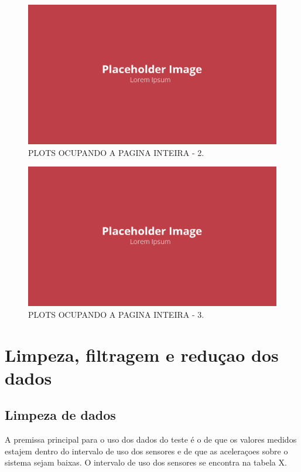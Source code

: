 \begin{figure}[!ht]
    \centering
    \includegraphics[width=.8\linewidth]{figuras/placeholder.png}
    \caption{PLOTS OCUPANDO A PAGINA INTEIRA - 2\cite{autor}.}
    \label{fig:placeholder}
\end{figure}

\begin{figure}[!ht]
    \centering
    \includegraphics[width=.8\linewidth]{figuras/placeholder.png}
    \caption{PLOTS OCUPANDO A PAGINA INTEIRA - 3\cite{autor}.}
    \label{fig:placeholder}
\end{figure}

\section{Limpeza, filtragem e reduçao dos dados}

\subsection{Limpeza de dados}

A premissa principal para o uso dos dados do teste é o de que os valores medidos estajem dentro do intervalo de uso dos sensores e de que as aceleraçoes sobre o sistema sejam baixas. O intervalo de uso dos sensores se encontra na tabela X.

